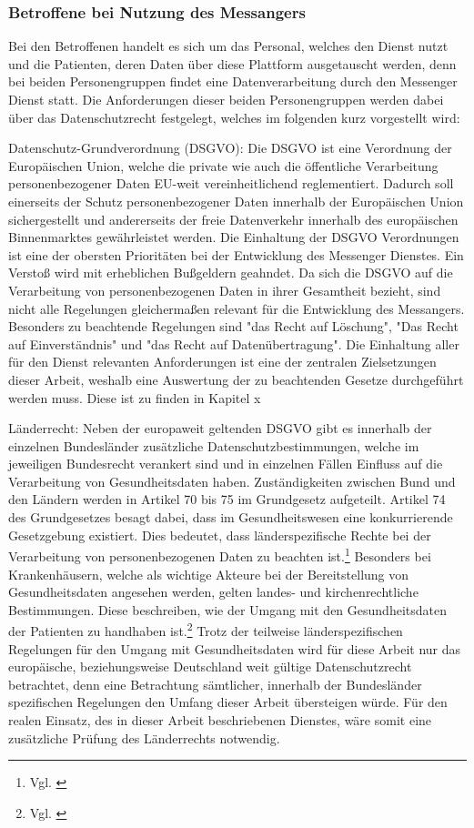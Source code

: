 \subsubsection{Betroffene bei Nutzung des Messangers}\label{subsection:bbndd}
Bei den Betroffenen handelt es sich um das Personal, welches den Dienst nutzt und die Patienten, deren Daten über diese Plattform ausgetauscht werden, denn bei beiden Personengruppen findet eine Datenverarbeitung durch den Messenger Dienst statt. Die Anforderungen dieser beiden Personengruppen werden dabei über das Datenschutzrecht festgelegt, welches im folgenden kurz vorgestellt wird:

Datenschutz-Grundverordnung (DSGVO): Die DSGVO ist eine Verordnung der Europäischen Union, welche die private wie auch die öffentliche Verarbeitung personenbezogener Daten EU-weit vereinheitlichend reglementiert. Dadurch soll einerseits der Schutz personenbezogener Daten innerhalb der Europäischen Union sichergestellt und andererseits der freie Datenverkehr innerhalb des europäischen Binnenmarktes gewährleistet werden. Die Einhaltung der DSGVO Verordnungen ist eine der obersten Prioritäten bei der Entwicklung des Messenger Dienstes. Ein Verstoß wird mit erheblichen Bußgeldern geahndet. Da sich die DSGVO auf die Verarbeitung von personenbezogenen Daten in ihrer Gesamtheit bezieht, sind nicht alle Regelungen gleichermaßen relevant für die Entwicklung des Messangers. Besonders zu beachtende Regelungen sind "das Recht auf Löschung", "Das Recht auf Einverständnis" und "das Recht auf Datenübertragung". Die Einhaltung aller für den Dienst relevanten Anforderungen ist eine der zentralen Zielsetzungen dieser Arbeit, weshalb eine Auswertung der zu beachtenden Gesetze durchgeführt werden muss. Diese ist zu finden in Kapitel x

Länderrecht: Neben der europaweit geltenden DSGVO gibt es innerhalb der einzelnen Bundesländer zusätzliche Datenschutzbestimmungen, welche im jeweiligen Bundesrecht verankert sind und in einzelnen Fällen Einfluss auf die Verarbeitung von Gesundheitsdaten haben.
Zuständigkeiten zwischen Bund und den Ländern werden in Artikel 70 bis 75 im Grundgesetz aufgeteilt. Artikel 74 des Grundgesetzes besagt dabei, dass im Gesundheitswesen eine konkurrierende Gesetzgebung existiert. Dies bedeutet, dass länderspezifische Rechte bei der Verarbeitung von personenbezogenen Daten zu beachten ist.\footnote{Vgl. \cite[S. 8]{Schubert2014}} Besonders bei Krankenhäusern, welche als wichtige Akteure bei der Bereitstellung von Gesundheitsdaten angesehen werden, gelten landes- und kirchenrechtliche Bestimmungen. Diese beschreiben, wie der Umgang mit den Gesundheitsdaten der Patienten zu handhaben ist.\footnote{Vgl. \cite[S. 21]{OrientierungshilfezumGesundheitsdatenschutz2018}}
Trotz der teilweise länderspezifischen Regelungen für den Umgang mit Gesundheitsdaten wird für diese Arbeit nur das europäische, beziehungsweise Deutschland weit gültige Datenschutzrecht betrachtet, denn eine Betrachtung sämtlicher, innerhalb der Bundesländer spezifischen Regelungen den Umfang dieser Arbeit übersteigen würde. Für den realen Einsatz, des in dieser Arbeit beschriebenen Dienstes, wäre somit eine zusätzliche Prüfung des Länderrechts notwendig.

